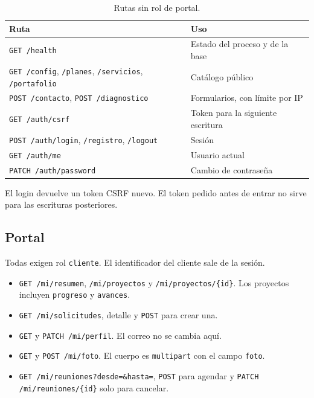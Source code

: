 \begin{table}[H]
  \centering
  \caption{Rutas sin rol de portal.}
  \small
  \begin{tabularx}{\textwidth}{@{}l Y@{}}
    \toprule
    Ruta & Uso \\
    \midrule
    \texttt{GET /health} & Estado del proceso y de la base \\
    \texttt{GET /config}, \texttt{/planes}, \texttt{/servicios}, \texttt{/portafolio} & Catálogo público \\
    \texttt{POST /contacto}, \texttt{POST /diagnostico} & Formularios, con límite por IP \\
    \texttt{GET /auth/csrf} & Token para la siguiente escritura \\
    \texttt{POST /auth/login}, \texttt{/registro}, \texttt{/logout} & Sesión \\
    \texttt{GET /auth/me} & Usuario actual \\
    \texttt{PATCH /auth/password} & Cambio de contraseña \\
    \bottomrule
  \end{tabularx}
\end{table}

El login devuelve un token CSRF nuevo. El token pedido antes de entrar no
sirve para las escrituras posteriores.

\subsection{Portal}

Todas exigen rol \texttt{cliente}. El identificador del cliente sale de la
sesión.

\begin{itemize}
  \item \texttt{GET /mi/resumen}, \texttt{/mi/proyectos} y \texttt{/mi/proyectos/\{id\}}.
        Los proyectos incluyen \texttt{progreso} y \texttt{avances}.
  \item \texttt{GET /mi/solicitudes}, detalle y \texttt{POST} para crear una.
  \item \texttt{GET} y \texttt{PATCH /mi/perfil}. El correo no se cambia aquí.
  \item \texttt{GET} y \texttt{POST /mi/foto}. El cuerpo es \texttt{multipart}
        con el campo \texttt{foto}.
  \item \texttt{GET /mi/reuniones?desde=\&hasta=}, \texttt{POST} para agendar
        y \texttt{PATCH /mi/reuniones/\{id\}} solo para cancelar.
\end{itemize}

